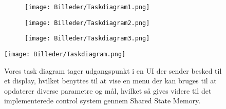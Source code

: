 \begin{figure}[h]
\centering
\begin{subfigure}[b]{0.3\textwidth}
	\texttt{[image: Billeder/Taskdiagram1.png]}
	\caption{}
	\label{fig:tilt_spejl}
    \end{subfigure}
    \begin{subfigure}[b]{0.3\textwidth}
\texttt{[image: Billeder/Taskdiagram2.png]}
	\caption{}
	\label{fig:tilt_spejl}
    \end{subfigure}
    \begin{subfigure}[b]{0.3\textwidth}
	\texttt{[image: Billeder/Taskdiagram3.png]}
	\caption{}
	\label{fig:tilt_spejl}
    \end{subfigure}
	\begin{center}
		\texttt{[image: Billeder/Taskdiagram.png]}
	\end{center}
\label{fig:taskdiagram}
\caption{Vores task diagram tager udgangspunkt i en UI der sender besked til et display, hvilket benyttes til at vise en menu der kan bruges til at opdaterer diverse parametre og mål, hvilket så gives videre til det implementerede control system gennem Shared State Memory.}
\end{figure}
